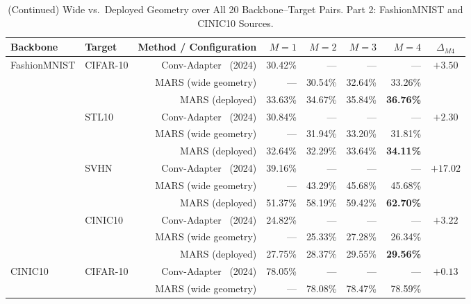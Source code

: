 \documentclass[12pt, a4paper]{report}
\numberwithin{equation}{chapter}
\numberwithin{figure}{chapter}
\numberwithin{table}{chapter}
\numberwithin{algorithm}{chapter}
\begin{document}
\begin{table}[H]
\centering
\addtocounter{table}{-1}
\caption{(Continued) Wide vs.\ Deployed Geometry over All 20 Backbone--Target Pairs. Part 2: FashionMNIST and CINIC10 Sources.}
\footnotesize
\renewcommand{\arraystretch}{0.92}%
\setlength{\tabcolsep}{4pt}%
\setlength{\aboverulesep}{0.15ex}%
\setlength{\belowrulesep}{0.3ex}%
\begin{tabular}{llrrrrrc}
\toprule
\textbf{Backbone} & \textbf{Target} & \multicolumn{1}{l}{\textbf{Method / Configuration}} & \textbf{$M{=}1$} & \textbf{$M{=}2$} & \textbf{$M{=}3$} & \textbf{$M{=}4$} & \textbf{$\Delta_{M4}$} \\
\midrule
\multirow{12}{*}{FashionMNIST} & \multirow{3}{*}{CIFAR-10} & Conv-Adapter~\cite{Chen2024ConvAdapter} (2024) & 30.42\% & --- & --- & --- & \multirow{3}{*}{$+3.50$} \\
 & & MARS (wide geometry) & --- & 30.54\% & 32.64\% & 33.26\% & \\
 & & MARS (deployed) & 33.63\% & 34.67\% & 35.84\% & \textbf{36.76\%} & \\
\cmidrule(lr){2-8}
 & \multirow{3}{*}{STL10} & Conv-Adapter~\cite{Chen2024ConvAdapter} (2024) & 30.84\% & --- & --- & --- & \multirow{3}{*}{$+2.30$} \\
 & & MARS (wide geometry) & --- & 31.94\% & 33.20\% & 31.81\% & \\
 & & MARS (deployed) & 32.64\% & 32.29\% & 33.64\% & \textbf{34.11\%} & \\
\cmidrule(lr){2-8}
 & \multirow{3}{*}{SVHN} & Conv-Adapter~\cite{Chen2024ConvAdapter} (2024) & 39.16\% & --- & --- & --- & \multirow{3}{*}{$+17.02$} \\
 & & MARS (wide geometry) & --- & 43.29\% & 45.68\% & 45.68\% & \\
 & & MARS (deployed) & 51.37\% & 58.19\% & 59.42\% & \textbf{62.70\%} & \\
\cmidrule(lr){2-8}
 & \multirow{3}{*}{CINIC10} & Conv-Adapter~\cite{Chen2024ConvAdapter} (2024) & 24.82\% & --- & --- & --- & \multirow{3}{*}{$+3.22$} \\
 & & MARS (wide geometry) & --- & 25.33\% & 27.28\% & 26.34\% & \\
 & & MARS (deployed) & 27.75\% & 28.37\% & 29.55\% & \textbf{29.56\%} & \\
\midrule
\multirow{12}{*}{CINIC10} & \multirow{3}{*}{CIFAR-10} & Conv-Adapter~\cite{Chen2024ConvAdapter} (2024) & 78.05\% & --- & --- & --- & \multirow{3}{*}{$+0.13$} \\
 & & MARS (wide geometry) & --- & 78.08\% & 78.47\% & 78.59\% & \\

\end{tabular}
\end{table}
\end{document}
